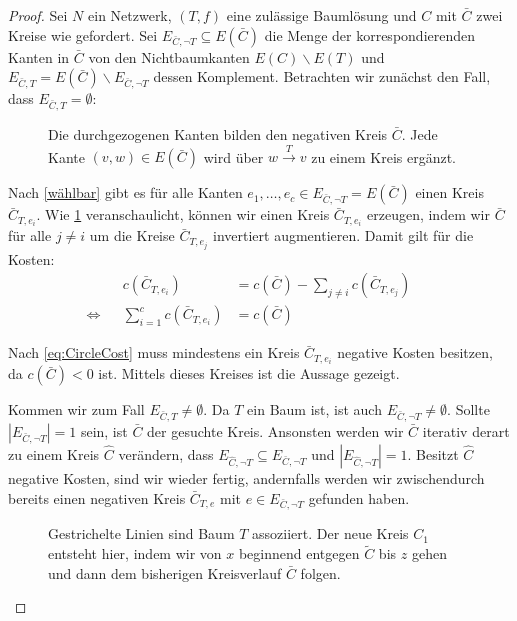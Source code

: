 \begin{proof}Sei $N$ ein Netzwerk, $(T,f)$ eine zulässige Baumlösung und $C$ mit $\bar{C}$ zwei Kreise wie gefordert. Sei $E_{\bar{C},\neg T}\subseteq E(\bar{C})$ die Menge der korrespondierenden Kanten in $\bar{C}$ von den Nichtbaumkanten $E(C)\backslash E(T)$ und $E_{\bar{C},T}=E(\bar{C})\backslash E_{\bar{C},\neg T}$ dessen Komplement. Betrachten wir zunächst den Fall, dass $E_{\bar{C},T}=\emptyset$:

\begin{figure}[!ht]\centering
	
	\caption{Die durchgezogenen Kanten bilden den negativen Kreis $\bar{C}$. Jede Kante $(v,w)\in E(\bar{C})$ wird über $w\xrightarrow{T}v$ zu einem Kreis ergänzt.}
	\label{fig:NTC}
\end{figure}

Nach \cref{wählbar} gibt es für alle Kanten $e_1,\ldots,e_c\in E_{\bar{C},\neg T}=E(\bar{C})$ einen Kreis $\bar{C}_{T,e_i}$. Wie \cref{fig:NTC} veranschaulicht, können wir einen Kreis $\bar{C}_{T,e_i}$ erzeugen, indem wir $\bar{C}$ für alle $j\neq i$ um die Kreise $\bar{C}_{T,e_j}$ invertiert augmentieren. Damit gilt für die Kosten:
\begin{align}
&&c(\bar{C}_{T,e_i})&=c(\bar{C})-\sum_{j\neq i} c(\bar{C}_{T,e_j})&&\nonumber\\
\Leftrightarrow&&\sum_{i=1}^{c} c(\bar{C}_{T,e_i})&=c(\bar{C})&&\label{eq:CircleCost}
\end{align}

Nach \cref{eq:CircleCost} muss mindestens ein Kreis $\bar{C}_{T,e_i}$ negative Kosten besitzen, da $c(\bar{C})<0$ ist. Mittels dieses Kreises ist die Aussage gezeigt.

Kommen wir zum Fall $E_{\bar{C},T}\neq\emptyset$. Da $T$ ein Baum ist, ist auch $E_{\bar{C},\neg T}\neq\emptyset$. Sollte $|E_{\bar{C},\neg T}|=1$ sein, ist $\bar{C}$ der gesuchte Kreis. Ansonsten werden wir $\bar{C}$ iterativ derart zu einem Kreis $\hat{C}$ verändern, dass $E_{\hat{C},\neg T}\subseteq E_{\bar{C},\neg T}$ und $|E_{\hat{C},\neg T}|=1$. Besitzt $\hat{C}$ negative Kosten, sind wir wieder fertig, andernfalls werden wir zwischendurch bereits einen negativen Kreis $\bar{C}_{T,e}$ mit $e\in E_{\bar{C},\neg T}$ gefunden haben.

\begin{figure}[!ht]\centering
	
	\caption{Gestrichelte Linien sind Baum $T$ assoziiert. Der neue Kreis $C_1$ entsteht hier, indem wir von $x$ beginnend entgegen $\tilde{C}$ bis $z$ gehen und dann dem bisherigen Kreisverlauf $\bar{C}$ folgen.}
	\label{fig:TC}
\end{figure}


\end{proof}
